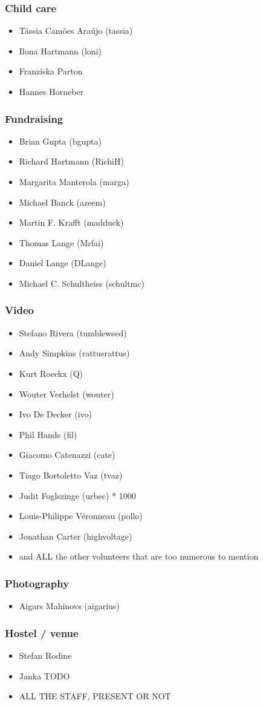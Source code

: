 \documentclass[t]{beamer}
\begin{document}
\begin{frame}
	\frametitle{Child care}
	\begin{itemize}
		\item Tássia Camões Araújo (tassia)
		\item Ilona Hartmann (loni)
		\item Franziska Parton
		\item Hannes Horneber
	\end{itemize}
\end{frame}

\begin{frame}
	\frametitle{Fundraising}
	\begin{itemize}
		\item Brian Gupta (bgupta)
		\item Richard Hartmann (RichiH)
		\item Margarita Manterola (marga)
		\item Michael Banck (azeem)
		\item Martin F. Krafft (madduck)
		\item Thomas Lange (Mrfai)
		\item Daniel Lange (DLange)
		\item Michael C. Schultheiss (schultmc)
	\end{itemize}
\end{frame}

\begin{frame}
	\frametitle{Video}
	\begin{itemize}
		\item Stefano Rivera (tumbleweed)
		\item Andy Simpkins (rattusrattus)
		\item Kurt Roeckx (Q)
		\item Wouter Verhelst (wouter)
		\item Ivo De Decker (ivo)
		\item Phil Hands (fil)
		\item Giacomo Catenazzi (cate)
		\item Tiago Bortoletto Vaz (tvaz)
		\item Judit Foglszinge (urbec) * 1000
		\item Louis-Philippe Véronneau (pollo)
		\item Jonathan Carter (highvoltage)
		\item and ALL the other volunteers that are too numerous to mention
	\end{itemize}
\end{frame}

\begin{frame}
	\frametitle{Photography}
	\begin{itemize}
		\item Aigars Mahinovs (aigarius)
	\end{itemize}
\end{frame}

\begin{frame}
	\frametitle{Hostel / venue}
	\begin{itemize}
		\item Stefan Rodine
		\item Janka TODO
		\item ALL THE STAFF, PRESENT OR NOT
	\end{itemize}
\end{frame}
\end{document}
